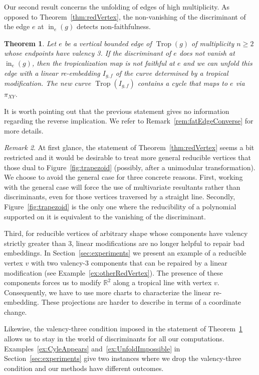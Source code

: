 \documentclass[11pt]{amsart}
\numberwithin{equation}{section}
\theoremstyle{plain}
\newtheorem{theorem}{Theorem}[section]
\theoremstyle{definition}
\theoremstyle{remark}
\newtheorem{remark}[theorem]{Remark}
\begin{document}
Our second result concerns the unfolding of edges of high
multiplicity. As opposed to Theorem~\ref{thm:redVertex}, the
non-vanishing of the discriminant of the edge $e$ at $\operatorname{in}_e(g)$ 
detects non-faithfulness.
\begin{theorem}\label{thm:fatEdge}
  Let $e$ be a vertical bounded edge of $\operatorname{Trop}(g)$ of multiplicity
  $n\geq 2$ whose endpoints have valency 3. If the discriminant of $e$
  does not vanish at $\operatorname{in}_e(g)$, then the tropicalization map is not
  faithful at $e$ and we can unfold this edge with a linear
  re-embedding $I_{g,f}$ of the curve determined by a tropical
  modification. The new curve $\operatorname{Trop}(I_{g,f})$ contains a cycle that
  maps to $e$ via $\pi_{XY}$.
\end{theorem}
\noindent
It is worth pointing out that the previous statement gives no information regarding the reverse implication. We refer to Remark~\ref{rem:fatEdgeConverse} for more details.

\begin{remark}\label{rem:DisclaimerThmDecontracting}
  At first glance, the statement of Theorem~\ref{thm:redVertex} seems
  a bit restricted and it would be desirable to treat more general
  reducible vertices that those dual to Figure~\ref{fig:trapezoid}
  (possibly, after a unimodular transformation). We choose to avoid
  the general case for three concrete reasons. First, working with the
  general case will force the use of multivariate resultants rather
  than discriminants, even for those vertices traversed by a straight
  line. Secondly, Figure~\ref{fig:trapezoid} is the only one where the
  reducibility of a polynomial supported on it is equivalent to the
  vanishing of the discriminant. 

  Third, for reducible vertices of arbitrary shape whose components
  have valency strictly greater than $3$, linear modifications are no
  longer helpful to repair bad embeddings. In
  Section~\ref{sec:experiments} we present an example of a reducible
  vertex $v$ with two valency-3 components that can be repaired by a
  linear modification (see Example~\ref{ex:otherRedVertex}). The
  presence of these components forces us to modify ${\mathbb{R}}^2$ along a
  tropical line with vertex $v$. Consequently, we have to use more
  charts to characterize the linear re-embedding. These projections
  are harder to describe in terms of a coordinate change.

  Likewise, the valency-three condition imposed in the statement of
  Theorem~\ref{thm:fatEdge} allows us to stay in the world of
  discriminants for all our computations.
  Examples~\ref{ex:CyleAppears} and~\ref{ex:UnfoldImpossible} in
  Section~\ref{sec:experiments} give two instances where we drop the
  valency-three condition and our methods have different
  outcomes. 
\end{remark}
\end{document}

